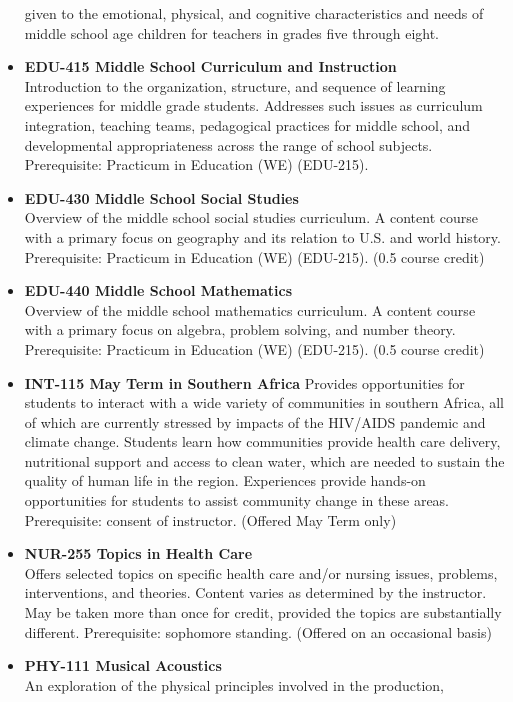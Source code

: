 \documentclass[
  letterpaper,
]{scrbook}
\begin{document}
\begin{itemize}
  given to the emotional, physical, and cognitive characteristics and
  needs of middle school age children for teachers in grades five
  through eight.
\item
  \textbf{EDU-415 Middle School Curriculum and Instruction}\\
  Introduction to the organization, structure, and sequence of learning
  experiences for middle grade students. Addresses such issues as
  curriculum integration, teaching teams, pedagogical practices for
  middle school, and developmental appropriateness across the range of
  school subjects. Prerequisite: Practicum in Education (WE) (EDU-215).
\item
  \textbf{EDU-430 Middle School Social Studies}\\
  Overview of the middle school social studies curriculum. A content
  course with a primary focus on geography and its relation to U.S. and
  world history. Prerequisite: Practicum in Education (WE) (EDU-215).
  (0.5 course credit)
\item
  \textbf{EDU-440 Middle School Mathematics}\\
  Overview of the middle school mathematics curriculum. A content course
  with a primary focus on algebra, problem solving, and number theory.
  Prerequisite: Practicum in Education (WE) (EDU-215). (0.5 course
  credit)
\item
  \textbf{INT-115 May Term in Southern Africa} Provides opportunities
  for students to interact with a wide variety of communities in
  southern Africa, all of which are currently stressed by impacts of the
  HIV/AIDS pandemic and climate change. Students learn how communities
  provide health care delivery, nutritional support and access to clean
  water, which are needed to sustain the quality of human life in the
  region. Experiences provide hands-on opportunities for students to
  assist community change in these areas. Prerequisite: consent of
  instructor. (Offered May Term only)
\item
  \textbf{NUR-255 Topics in Health Care}\\
  Offers selected topics on specific health care and/or nursing issues,
  problems, interventions, and theories. Content varies as determined by
  the instructor. May be taken more than once for credit, provided the
  topics are substantially different. Prerequisite: sophomore standing.
  (Offered on an occasional basis)
\item
  \textbf{PHY-111 Musical Acoustics}\\
  An exploration of the physical principles involved in the production,

\end{itemize}
\end{document}
